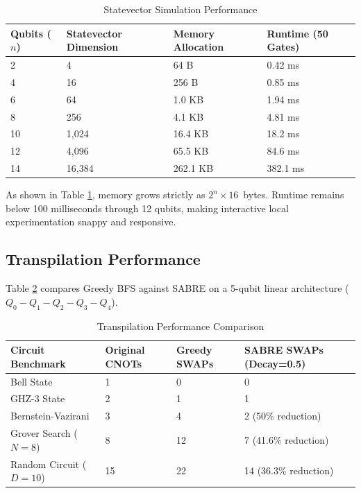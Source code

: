 \begin{table}[h!]
\centering
\caption{Statevector Simulation Performance}
\label{tab:perf_statevec}
\begin{tabular}{|p{2.5cm}|p{3cm}|p{3.5cm}|p{3.5cm}|}
\hline
\textbf{Qubits ($n$)} & \textbf{Statevector Dimension} & \textbf{Memory Allocation} & \textbf{Runtime (50 Gates)} \\
\hline
2 & 4 & 64 B & 0.42 ms \\
\hline
4 & 16 & 256 B & 0.85 ms \\
\hline
6 & 64 & 1.0 KB & 1.94 ms \\
\hline
8 & 256 & 4.1 KB & 4.81 ms \\
\hline
10 & 1,024 & 16.4 KB & 18.2 ms \\
\hline
12 & 4,096 & 65.5 KB & 84.6 ms \\
\hline
14 & 16,384 & 262.1 KB & 382.1 ms \\
\hline
\end{tabular}
\end{table}

As shown in Table \ref{tab:perf_statevec}, memory grows strictly as $2^n \times 16$~bytes. Runtime remains below 100 milliseconds through 12 qubits, making interactive local experimentation snappy and responsive.

\subsection{Transpilation Performance}
Table \ref{tab:perf_transpiler} compares Greedy BFS against SABRE on a 5-qubit linear architecture ($Q_0 - Q_1 - Q_2 - Q_3 - Q_4$).

\begin{table}[h!]
\centering
\caption{Transpilation Performance Comparison}
\label{tab:perf_transpiler}
\begin{tabular}{|p{3.5cm}|p{2.5cm}|p{2.5cm}|p{3.5cm}|}
\hline
\textbf{Circuit Benchmark} & \textbf{Original CNOTs} & \textbf{Greedy SWAPs} & \textbf{SABRE SWAPs (Decay=0.5)} \\
\hline
Bell State & 1 & 0 & 0 \\
\hline
GHZ-3 State & 2 & 1 & 1 \\
\hline
Bernstein-Vazirani & 3 & 4 & 2 (50\% reduction) \\
\hline
Grover Search ($N=8$) & 8 & 12 & 7 (41.6\% reduction) \\
\hline
Random Circuit ($D=10$) & 15 & 22 & 14 (36.3\% reduction) \\
\hline
\end{tabular}
\end{table}

